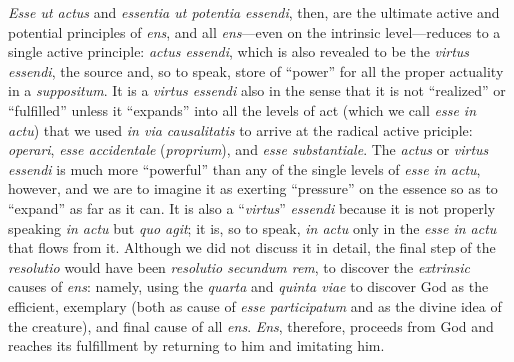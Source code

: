 \emph{Esse ut actus} and \emph{essentia ut potentia essendi}, then, are the ultimate active and potential principles of \emph{ens}, and all \emph{ens}---even on the intrinsic level---reduces to a single active principle: \emph{actus essendi}, which is also revealed to be the \emph{virtus essendi}, the source and, so to speak, store of ``power'' for all the proper actuality in a \emph{suppositum}. It is a \emph{virtus essendi} also in the sense that it is not ``realized'' or ``fulfilled'' unless it ``expands'' into all the levels of act (which we call \emph{esse in actu}) that we used \emph{in via causalitatis} to arrive at the radical active priciple: \emph{operari}, \emph{esse accidentale} (\emph{proprium}), and \emph{esse substantiale}. The \emph{actus} or \emph{virtus essendi} is much more ``powerful'' than any of the single levels of \emph{esse in actu}, however, and we are to imagine it as exerting ``pressure'' on the essence so as to ``expand'' as far as it can. It is also a ``\emph{virtus}'' \emph{essendi} because it is not properly speaking \emph{in actu} but \emph{quo agit}; it is, so to speak, \emph{in actu} only in the \emph{esse in actu} that flows from it. Although we did not discuss it in detail, the final step of the \emph{resolutio} would have been \emph{resolutio secundum rem}, to discover the \emph{extrinsic} causes of \emph{ens}: namely, using the \emph{quarta} and \emph{quinta viae} to discover God as the efficient, exemplary (both as cause of \emph{esse participatum} and as the divine idea of the creature), and final cause of all \emph{ens}. \emph{Ens}, therefore, proceeds from God and reaches its fulfillment by returning to him and imitating him. 

